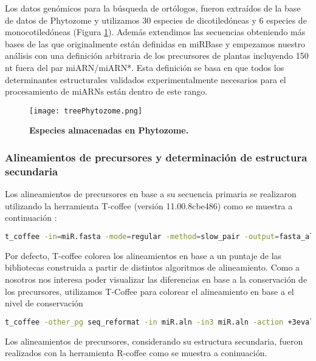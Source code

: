 Los datos genómicos para la búsqueda de ortólogos, fueron extraídos de la base de datos de Phytozome y utilizamos 30 especies de dicotiledóneas y 6 especies de monocotiledóneas (Figura \ref{fig:treePhytozome}).
Además extendimos las secuencias obteniendo más bases de las que originalmente están definidas en miRBase y empezamos nuestro análisis con una definición arbitraria de los precursores de plantas incluyendo 150 nt fuera del par miARN/miARN*.
Esta definición se basa en que todos los determinantes estructurales validados experimentalmente necesarios para el procesamiento de miARNs están dentro de este rango.

\begin{figure}[htbp!] 
    \centering    
    \texttt{[image: treePhytozome.png]}
    \caption[Especies almacenadas en Phytozome]{
    \textbf{Especies almacenadas en Phytozome.}
    }
    \label{fig:treePhytozome}
\end{figure}

\subsubsection{Alineamientos de precursores y determinación de estructura secundaria}

Los alineamientos de precursores en base a su secuencia primaria se realizaron utilizando la herramienta T-coffee (versión 11.00.8cbe486) \citep{pmid10964570} como se muestra a continuación :

\begin{lstlisting}[language=bash]
t_coffee -in=miR.fasta -mode=regular -method=slow_pair -output=fasta_aln -quiet=stdout -out=miR.aln
\end{lstlisting}

Por defecto, T-coffee colorea los alineamientos en base a un puntaje de las bibliotecas construida a partir de distintos algoritmos de alineamiento.
Como a nosotros nos interesa poder visualizar las diferencias en base a la conservación de los precursores, utilizamos T-Coffee para colorear el alineamiento en base a el nivel de conservación

\begin{lstlisting}[language=bash]
t_coffee -other_pg seq_reformat -in miR.aln -in3 miR.aln -action +3evaluate idmat -out=miR_T_Coffee.pdf
\end{lstlisting}

Los alineamientos de precursores, considerando su estructura secundaria, fueron realizados con la herramienta R-coffee \citep{pmid18292307} como se muestra a coninuación.

